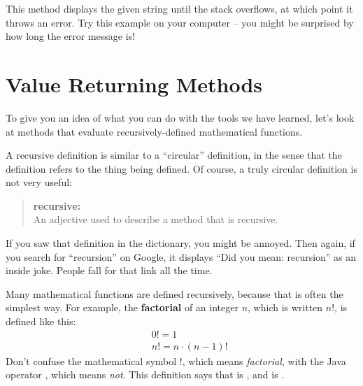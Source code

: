 
This method displays the given string until the stack overflows, at which point it throws an error.
Try this example on your computer -- you might be surprised by how long the error message is!


\section{Value Returning Methods}
\label{factorial}


%
%

To give you an idea of what you can do with the tools we have learned, let's look at methods that evaluate recursively-defined mathematical functions.

A recursive definition is similar to a ``circular'' definition, in the sense that the definition refers to the thing being defined.
Of course, a truly circular definition is not very useful:

\begin{quote}
{\bf recursive:} \\
An adjective used to describe a method that is recursive.
\end{quote}


If you saw that definition in the dictionary, you might be annoyed.
Then again, if you search for ``recursion'' on Google, it displays ``Did you mean: recursion'' as an inside joke.
People fall for that link all the time.


Many mathematical functions are defined recursively, because that is often the simplest way.
For example, the {\bf factorial} of an integer $n$, which is written $n!$, is defined like this:
%
\begin{eqnarray*}
&&  0! = 1 \\
&&  n! = n \cdot(n-1)!
\end{eqnarray*}
%
Don't confuse the mathematical symbol $!$, which means {\em factorial}, with the Java operator \java{!}, which means {\em not}.
This definition says that  is , and  is .

